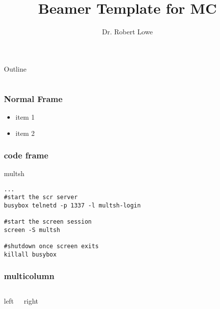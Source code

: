 \documentclass[handout]{beamer}
\title{Beamer Template for MC}
\author{Dr. Robert Lowe\\}
\institute[Maryville College] %
{
  Division of Mathematics and Computer Science\\
  Maryville College
}
\date[]{}
\begin{document}
\begin{frame}
  \titlepage
\end{frame}

\begin{frame}{Outline}
  \tableofcontents
\end{frame}





\section{}
\begin{frame}
  \frametitle{Normal Frame}
  \begin{itemize}
    \item item 1
    \item item 2
  \end{itemize}
\end{frame}


\begin{frame}[fragile]
  \frametitle{code frame}
  \begin{block}{multsh}
\begin{verbatim}
...
#start the scr server
busybox telnetd -p 1337 -l multsh-login

#start the screen session
screen -S multsh

#shutdown once screen exits
killall busybox
\end{verbatim}
  \end{block}
\end{frame}


\begin{frame}
  \frametitle{multicolumn}
  \begin{columns}
  \begin{block}{left}
  \end{block}
  \begin{block}{right}
  \end{block}
  \end{columns}
\end{frame}
\end{document}
